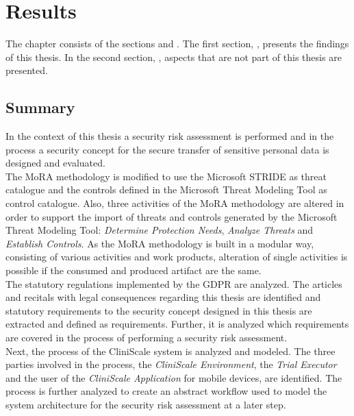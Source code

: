 \chapter{Results}
\label{results}
The chapter \textit{} consists of the sections \textit{} and \textit{}. The first section, \textit{}, presents the findings of this thesis. In the second section, \textit{}, aspects that are not part of this thesis are presented.

\section{Summary}
\label{summary}
In the context of this thesis a security risk assessment is performed and in the process a security concept for the secure transfer of sensitive personal data is designed and evaluated. \\
\newline
The MoRA methodology is modified to use the Microsoft STRIDE as threat catalogue and the controls defined in the Microsoft Threat Modeling Tool as control catalogue. Also, three activities of the MoRA methodology are altered in order to support the import of threats and controls generated by the Microsoft Threat Modeling Tool: \textit{Determine Protection Needs}, \textit{Analyze Threats} and \textit{Establish Controls}. As the MoRA methodology is built in a modular way, consisting of various activities and work products, alteration of single activities is possible if the consumed and produced artifact are the same.\\
\newline
The statutory regulations implemented by the GDPR are analyzed. The articles and recitals with legal consequences regarding this thesis are identified and statutory requirements to the security concept designed in this thesis are extracted and defined as requirements. Further, it is analyzed which requirements are covered in the process of performing a security risk assessment.\\
Next, the process of the CliniScale system is analyzed and modeled. The three parties involved in the process, the \textit{CliniScale Environment}, the \textit{Trial Executor} and the user of the \textit{CliniScale Application} for mobile devices, are identified. The process is further analyzed to create an abstract workflow used to model the system architecture for the security risk assessment at a later step.\\
